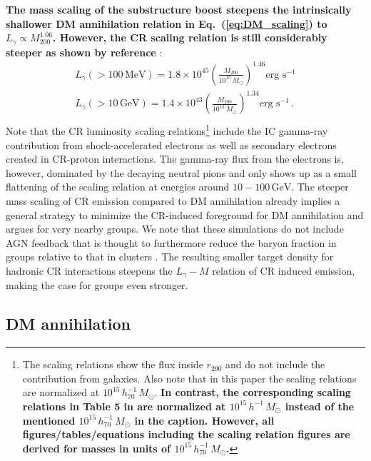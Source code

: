 \documentclass[10pt,aps,pra,reprint,amsmath,amsfonts,amssymb,showpacs,nofootinbib,floatfix]{revtex4-1}
\def\C#1{{\bf #1}}
\newcommand{\rmn}{\mathrm}
\newcommand{\msun}{M_\odot}
\newcommand{\mev}{\rmn{MeV}}
\newcommand{\gev}{\rmn{GeV}}
\newcommand{\rvir}{r_{200}}
\newcommand{\mvir}{M_{200}}
\begin{document}
\C{The mass scaling of the substructure boost steepens the
  intrinsically shallower DM annihilation relation in
  Eq.~(\ref{eq:DM_scaling}) to $L_\gamma\propto \mvir^{1.06}$.
  However, the CR scaling relation is still considerably steeper as
  shown by reference} \cite{2010MNRAS.409..449P}:
\begin{eqnarray}
L_{\gamma}(>100\,\mev) = 1.8\times10^{45}
\left(\frac{\mvir}{10^{15}\,\msun}\right)^{1.46}\mbox{erg~s}^{-1}\nonumber\\
L_{\gamma}(>10\,\gev)  = 1.4\times10^{43}
\left(\frac{\mvir}{10^{15}\,\msun}\right)^{1.34}\mbox{erg~s}^{-1}\,.\nonumber\\
\end{eqnarray}
Note that the CR luminosity scaling relations\footnote{The scaling relations
  show the flux inside $\rvir$ and do not include the contribution from
  galaxies. Also note that in this paper the scaling relations are normalized at
  $10^{15}\,h_{70}^{-1}\,\msun$. \C{In contrast, the corresponding scaling
    relations in Table 5 in \cite{2010MNRAS.409..449P} are normalized at
    $10^{15}\,h^{-1}\,\msun$ instead of the mentioned
    $10^{15}\,h_{70}^{-1}\,\msun$ in the caption. However, all
    figures/tables/equations including the scaling relation figures are derived
    for masses in units of $10^{15}\,h_{70}^{-1}\,\msun$.}}  include the IC
gamma-ray contribution from shock-accelerated electrons as well as secondary
electrons created in CR-proton interactions. The gamma-ray flux from the
electrons is, however, dominated by the decaying neutral pions and only shows up
as a small flattening of the scaling relation at energies around
$10-100\,\gev$. The steeper mass scaling of CR emission compared to DM
annihilation already implies a general strategy to minimize the CR-induced
foreground for DM annihilation and argues for very nearby groups. We note that
these simulations do not include AGN feedback that is thought to furthermore
reduce the baryon fraction in groups relative to that in clusters
\cite{2008ApJ...687L..53P}. The resulting smaller target density for hadronic CR
interactions steepens the $L_\gamma-M$ relation of CR induced emission, making
the case for groups even stronger.

\subsection{DM annihilation}
\end{document}
